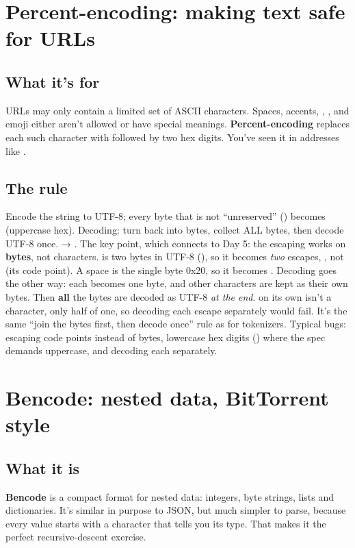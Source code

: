\documentclass[10pt,a4paper]{article}
\begin{document}
\section{Percent-encoding: making text safe for URLs}
\subsection{What it’s for}
URLs may only contain a limited set of ASCII characters. Spaces, accents, \code{\&\allowbreak{}}, , \code{/\allowbreak{}} and emoji either aren’t allowed or have special meanings. \textbf{Percent-encoding} replaces each such character with \code{\%} followed by two hex digits. You’ve seen it in addresses like .
\subsection{The rule}
Encode the string to UTF-8; every byte that is not “unreserved” () becomes  (uppercase hex). Decoding: turn  back into bytes, collect ALL bytes, then decode UTF-8 once.  → .
The key point, which connects to Day 5: the escaping works on \textbf{bytes}, not characters.  is two bytes in UTF-8 (), so it becomes \emph{two} escapes, , not  (its code point). A space is the single byte 0x20, so it becomes .
Decoding goes the other way: each  becomes one byte, and other characters are kept as their own bytes. Then \textbf{all} the bytes are decoded as UTF-8 \emph{at the end}.  on its own isn’t a character, only half of one, so decoding each escape separately would fail. It’s the same “join the bytes first, then decode once” rule as for tokenizers.
Typical bugs: escaping code points instead of bytes, lowercase hex digits () where the spec demands uppercase, and decoding each  separately.
\setcounter{section}{5}
\section{Bencode: nested data, BitTorrent style}
\subsection{What it is}
\textbf{Bencode} is a compact format for nested data: integers, byte strings, lists and dictionaries. It’s similar in purpose to JSON, but much simpler to parse, because every value starts with a character that tells you its type. That makes it the perfect recursive-descent exercise.
\end{document}
